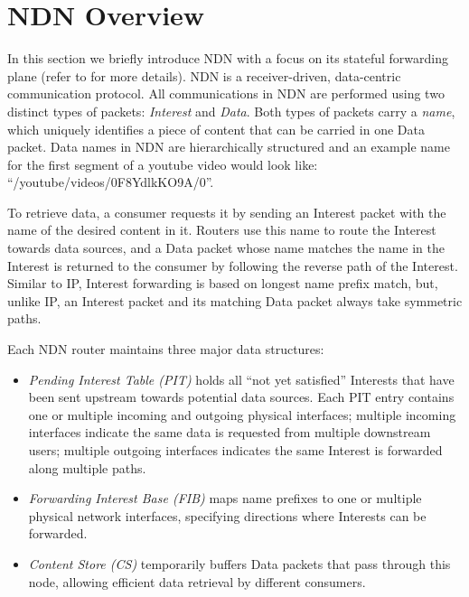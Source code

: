 \documentclass[10pt,conference]{IEEEtran}
\newcommand{\ndnName}[1]{``{\nicettfont #1}''}
\begin{document}
\section{NDN Overview\label{sec:ccn-intro}}

In this section we briefly introduce NDN with a focus on its stateful forwarding plane (refer to \cite{ndn-conext, ndn-tr, adaptive-forwarding} for more details).
NDN is a receiver-driven, data-centric communication protocol.
All communications in NDN are performed using two distinct types of packets: \textit{Interest} and \textit{Data}. Both types of packets carry a \textit{name}, which uniquely identifies a piece of content that can be carried in one Data packet. Data names in NDN are hierarchically structured and an example name for the first segment of a youtube video would look like: \ndnName{/youtube/videos/0F8YdlkKO9A/0}.

To retrieve data, a consumer requests it by sending an Interest packet with the name of the desired content in it.
Routers use this name to route the Interest towards data sources, and a Data packet whose name matches the name in the Interest is returned to the consumer by following the reverse path of the Interest. Similar to IP, Interest forwarding is based on longest name prefix match, but, unlike IP, an Interest packet and its matching Data packet always take symmetric paths.

Each NDN router maintains three major data structures:
\begin{itemize}
\item \textit{Pending Interest Table (PIT)} holds all ``not yet satisfied'' Interests that have been sent upstream towards potential data sources. Each PIT entry contains one or multiple incoming and outgoing physical interfaces; multiple incoming interfaces indicate the same data is requested from multiple downstream users; multiple outgoing interfaces indicates the same Interest is forwarded along multiple paths.
\item \textit{Forwarding Interest Base (FIB)} maps name prefixes to one or multiple physical network interfaces, specifying directions where Interests can be forwarded. 
\item \textit{Content Store (CS)} temporarily buffers Data packets that pass through this node, allowing efficient data retrieval by different consumers.
\end{itemize}
\end{document}
